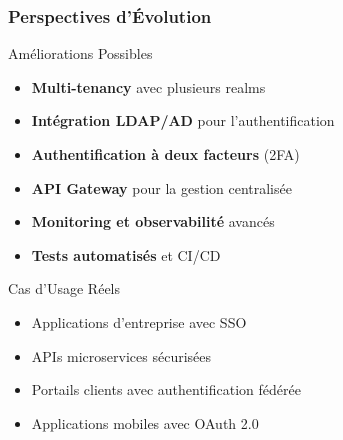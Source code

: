 \documentclass[aspectratio=169]{beamer}
\begin{document}
\begin{frame}
    \frametitle{Perspectives d'Évolution}
    \begin{block}{Améliorations Possibles}
        \begin{itemize}
            \item \textbf{Multi-tenancy} avec plusieurs realms
            \item \textbf{Intégration LDAP/AD} pour l'authentification
            \item \textbf{Authentification à deux facteurs} (2FA)
            \item \textbf{API Gateway} pour la gestion centralisée
            \item \textbf{Monitoring et observabilité} avancés
            \item \textbf{Tests automatisés} et CI/CD
        \end{itemize}
    \end{block}
    
    \begin{block}{Cas d'Usage Réels}
        \begin{itemize}
            \item Applications d'entreprise avec SSO
            \item APIs microservices sécurisées
            \item Portails clients avec authentification fédérée
            \item Applications mobiles avec OAuth 2.0
        \end{itemize}
    \end{block}
\end{frame}
\end{document}
